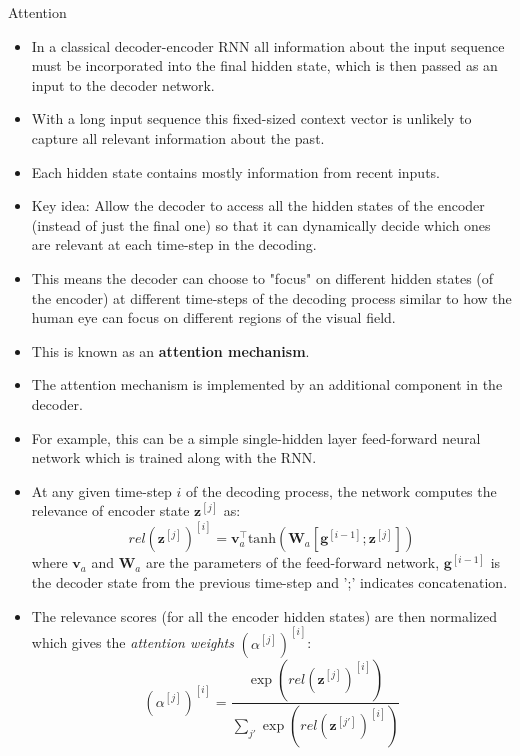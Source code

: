 \begin{vbframe}{Attention}
  \begin{itemize}
    \item In a classical decoder-encoder RNN all information about the input sequence must be incorporated into the final hidden state, which is then passed as an input to the decoder network.
    \item With a long input sequence this fixed-sized context vector is unlikely to capture all relevant information about the past.
      \item Each hidden state contains mostly information from recent inputs. 
      \item Key idea: Allow the decoder to access all the hidden states of the encoder (instead of just the final one) so that it can dynamically decide which ones are relevant at each time-step in the decoding.
      \item This means the decoder can choose to "focus" on different hidden states (of the encoder) at different time-steps of the decoding process similar to how the human eye can focus on different regions of the visual field.
      \item This is known as an \textbf{attention mechanism}.
   \end{itemize}
   
   \framebreak
   
   \begin{itemize}
      \item The attention mechanism is implemented by an additional component in the decoder.
      \item For example, this can be a simple single-hidden layer feed-forward neural network which is trained along with the RNN.
      \item At any given time-step $i$ of the decoding process, the network computes the relevance of encoder state $\mathbf{z}^{[j]}$ as:
            $$ rel(\mathbf{z}^{[j]})^{[i]} = \mathbf{v}_a^\top \text{tanh} (\mathbf{W}_a[\mathbf{g}^{[i-1]};\mathbf{z}^{[j]}]) $$
            where $\mathbf{v}_a$ and $\mathbf{W}_a$ are the parameters of the feed-forward network, $\mathbf{g}^{[i-1]}$ is the decoder state from the previous time-step and ';' indicates concatenation.
      \item The relevance scores (for all the encoder hidden states) are then normalized which gives the \textit{attention weights} $(\alpha^{[j]})^{[i]}$:      
        $$ (\alpha^{[j]})^{[i]} = \frac{\exp (rel(\mathbf{z}^{[j]})^{[i]})}{\sum_{j'} \exp(rel(\mathbf{z}^{[j']})^{[i]})} $$
   \end{itemize}
   

\end{vbframe}

